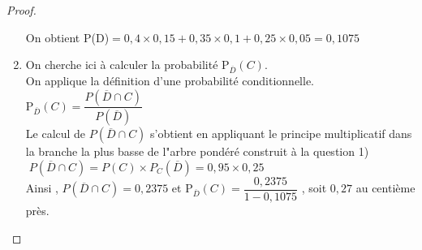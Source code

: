 \begin{proof}
\begin{enumerate}
On obtient \;P(D)$ = 0,4\times 0,15  + 0,35\times 0,1+0,25\times0,05 =0,1075$
\item On cherche ici à calculer  la probabilité  P$ _{\overline{D}}(C) $.\\
On applique la définition d'une probabilité conditionnelle.\\

P$ _{\overline{D}}(C)=\dfrac{P(\overline{D}\cap C)}{P(\overline{D})} $\\
Le calcul de \; $ P(\overline{D}\cap C )$ \; s'obtient en appliquant le principe multiplicatif  dans la branche la plus basse de l"arbre pondéré construit à la question 1) $\; P(\overline{D}\cap C )= P(C)\times P_{C}(\overline{D})= 0,95 \times 0,25$ \\

Ainsi , \; $ P(\overline{D}\cap C )=0,2375 $ \; et\;  P$ _{\overline{D}}(C)=\dfrac{0,2375}{1-0,1075}$ ,\;  soit \; $ 0,27 $\; au centième près.
\end{enumerate}


\end{proof}

